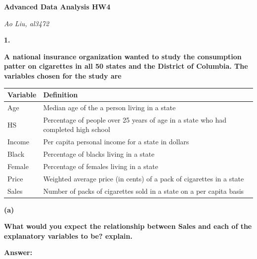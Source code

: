 \documentclass[letterpaper,11pt]{article}
\begin{document}
\begin{center}
	\textbf{\Huge{Advanced Data Analysis HW4}}
\end{center}

\begin{center}
	\textsl{Ao Liu, al3472}
\end{center}

\bigbreak
\bigbreak
\bigbreak



\begin{addmargin}[-2em]{0em}
  \large{\textbf{1. }}
\end{addmargin}
\textbf{A national insurance organization wanted to study the consumption patter on cigarettes in all 50 states and the District of Columbia. The variables chosen for the study are}\par

\begin{center}
\begin{tabular}{ p{2cm}p{12cm} }\\
Variable & Definition\\
\hline
Age & Median age of the a person living in a state\\
HS & Percentage of people over 25 years of age in a state who had completed high school\\
Income & Per capita personal income for a state in dollars\\
Black & Percentage of blacks living in a state\\
Female & Percentage of females living in a state\\
Price & Weighted average price (in cents) of a pack of cigarettes in a state\\
Sales & Number of packs of cigarettes sold in a state on a per capita basis\\
\end{tabular}
\end{center}

\begin{addmargin}[-1.1em]{0em}
  \textbf{(a)}\par
\end{addmargin}
\textbf{What would you expect the relationship between Sales and each of the explanatory variables to be? explain.}\par
\bigbreak
\begin{addmargin}[-0.5em]{0em}
  \textbf{Answer: }
\end{addmargin}
\end{document}
